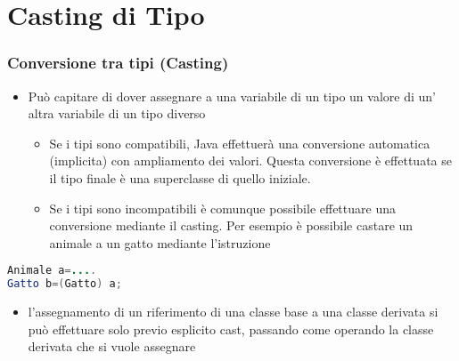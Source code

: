 \documentclass{beamer}
\begin{document}
\section{Casting di Tipo}
\begin{frame}[fragile]
\frametitle{Conversione tra tipi (Casting)}
\begin{itemize}
\item Pu\`o capitare di dover assegnare a una variabile di un tipo un valore di un' altra variabile di un tipo diverso
\begin{itemize}
\item Se i tipi sono compatibili, Java effettuerà una conversione automatica (implicita) con ampliamento dei valori. Questa conversione \`e effettuata se il tipo finale \`e una superclasse di quello iniziale. 
\item Se i tipi sono incompatibili \`e comunque possibile effettuare una conversione mediante il casting. Per esempio \`e possibile castare un animale a un gatto mediante l'istruzione
\end{itemize}

\end{itemize}
\begin{lstlisting}[language=Java,escapechar=|]
Animale a=....
Gatto b=(Gatto) a;
\end{lstlisting}
\begin{itemize}
 \item l'assegnamento di un riferimento di una classe base a una classe derivata si pu\`o effettuare solo previo esplicito cast, passando come operando la classe derivata che si vuole assegnare
\end{itemize}
\end{frame}
\end{document}
